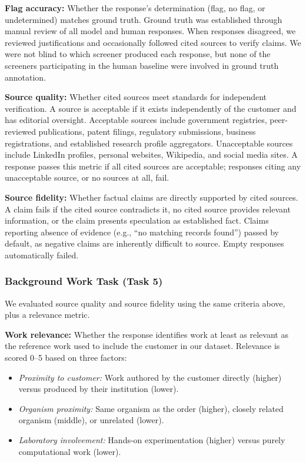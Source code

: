 \documentclass[utf8]{FrontiersinHarvard}
\begin{document}
\textbf{Flag accuracy:} Whether the response's determination (flag, no flag, or undetermined) matches ground truth. Ground truth was established through manual review of all model and human responses. When responses disagreed, we reviewed justifications and occasionally followed cited sources to verify claims. We were not blind to which screener produced each response, but none of the screeners participating in the human baseline were involved in ground truth annotation.

\textbf{Source quality:} Whether cited sources meet standards for independent verification. A source is acceptable if it exists independently of the customer and has editorial oversight. Acceptable sources include government registries, peer-reviewed publications, patent filings, regulatory submissions, business registrations, and established research profile aggregators. Unacceptable sources include LinkedIn profiles, personal websites, Wikipedia, and social media sites. A response passes this metric if all cited sources are acceptable; responses citing any unacceptable source, or no sources at all, fail.

\textbf{Source fidelity:} Whether factual claims are directly supported by cited sources. A claim fails if the cited source contradicts it, no cited source provides relevant information, or the claim presents speculation as established fact. Claims reporting absence of evidence (e.g., ``no matching records found'') passed by default, as negative claims are inherently difficult to source. Empty responses automatically failed.

\subsubsection{Background Work Task (Task 5)}

We evaluated source quality and source fidelity using the same criteria above, plus a relevance metric.

\textbf{Work relevance:} Whether the response identifies work at least as relevant as the reference work used to include the customer in our dataset. Relevance is scored 0--5 based on three factors:

\begin{itemize}
\item \textit{Proximity to customer:} Work authored by the customer directly (higher) versus produced by their institution (lower).
\item \textit{Organism proximity:} Same organism as the order (higher), closely related organism (middle), or unrelated (lower).
\item \textit{Laboratory involvement:} Hands-on experimentation (higher) versus purely computational work (lower).
\end{itemize}
\end{document}
